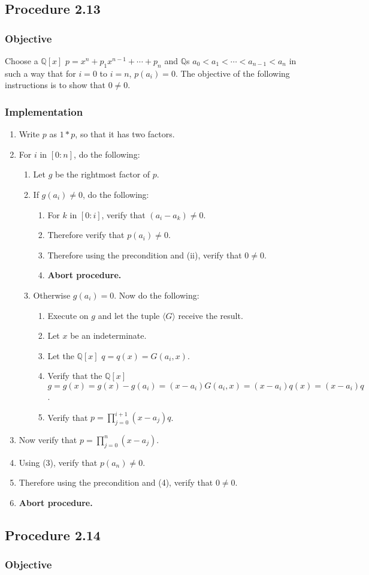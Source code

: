 \documentclass[twocolumn]{article}
\newcommand{\procedure}[2][]{\subsection*{Procedure #2 \ifthenelse{\equal{#1}{}}{}{(#1)}}\label{sec:procedure #2}}
\newcommand{\objective}{\subsubsection*{Objective}}
\newcommand{\implementation}{\subsubsection*{Implementation}}
\newcommand{\procedurehr}[2][]{\hyperref[sec:procedure #2]{\ifthenelse{\equal{#1}{}}{procedure #2}{#1}}}
\begin{document}
		\procedure{2.13}
			\objective
				Choose a $\mathbb{Q}[x]$ $p=x^n+p_1x^{n-1}+\cdots+p_n$ and $\mathbb{Q}$s $a_0<a_1<\cdots<a_{n-1}<a_{n}$ in such a way that for $i=0$ to $i=n$, $p(a_i)=0$. The objective of the following instructions is to show that $0\ne 0$.
			\implementation
				\begin{enumerate}
					\item Write $p$ as $1*p$, so that it has two factors.
					\item For $i$ in $[0:n]$, do the following:
					\begin{enumerate}
						\item Let $g$ be the rightmost factor of $p$.
						\item If $g(a_i)\ne 0$, do the following:
						\begin{enumerate}
							\item For $k$ in $[0:i]$, verify that $(a_i-a_k)\ne 0$.
							\item Therefore verify that $p(a_i)\ne 0$.
							\item Therefore using the precondition and (ii), verify that $0\ne 0$.
							\item \textbf{Abort procedure.}
						\end{enumerate}
						\item Otherwise $g(a_i)=0$. Now do the following:
						\begin{enumerate}
							\item Execute \procedurehr{2.12} on $g$ and let the tuple $\langle G\rangle$ receive the result.
							\item Let $x$ be an indeterminate.
							\item Let the $\mathbb{Q}[x]$ $q=q(x)=G(a_i,x)$.
							\item Verify that the $\mathbb{Q}[x]$ $g=g(x)=g(x)-g(a_i)=(x-a_i)G(a_i,x)=(x-a_i)q(x)=(x-a_i)q$.
							\item Verify that $p=\prod_{j=0}^{i+1}(x-a_j)q$.
						\end{enumerate}
					\end{enumerate}
					\item Now verify that $p=\prod_{j=0}^{n}(x-a_j)$.
					\item Using (3), verify that $p(a_{n})\ne 0$.
					\item Therefore using the precondition and (4), verify that $0\ne 0$.
					\item \textbf{Abort procedure.}
				\end{enumerate}
		\procedure{2.14}
			\objective
\end{document}
